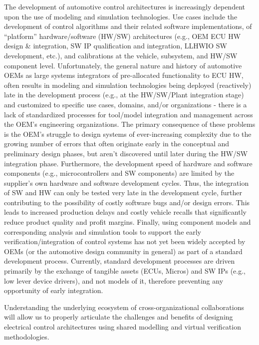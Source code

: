 The development of automotive control architectures is increasingly dependent upon the use of modeling and simulation technologies. Use cases include the development of control algorithms and their related software implementations, of “platform” hardware/software (HW/SW) architectures (e.g., OEM ECU HW design \& integration, SW IP qualification and integration, LLHWIO SW development, etc.), and calibrations at the vehicle, subsystem, and HW/SW component level. Unfortunately, the general nature and history of automotive OEMs as large systems integrators of pre-allocated functionality to ECU HW, often results in modeling and simulation technologies being deployed (reactively) late in the development process (e.g., at the HW/SW/Plant integration stage) and customized to specific use cases, domains, and/or organizations - there is a lack of standardized processes for tool/model integration and management across the OEM's engineering organizations.  The primary consequence of these problems is the OEM's struggle to design systems of ever-increasing complexity due to the growing number of errors that often originate early in the conceptual and preliminary design phases, but aren't discovered until later during the HW/SW integration phase. Furthermore, the development speed of hardware and software components (e.g., microcontrollers and SW components) are limited by the supplier's own hardware and software development cycles. Thus, the integration of SW and HW can only be tested very late in the development cycle, further contributing to the possibility of costly software bugs and/or design errors.  This leads to increased production delays and costly vehicle recalls that significantly reduce product quality and profit margins. Finally, using component models and corresponding analysis and simulation tools to support the early verification/integration of control systems has not yet been widely accepted by OEMs (or the automotive design community in general) as part of a standard development process. Currently, standard development processes are driven primarily by the exchange of tangible assets (ECUs, Micros) and SW IPs (e.g., low lever device drivers), and not models of it, therefore preventing any opportunity of early integration.

Understanding the underlying ecosystem of cross-organizational collaborations will allow us to properly articulate the challenges and benefits of designing electrical control architectures using shared modelling and virtual verification methodologies.

